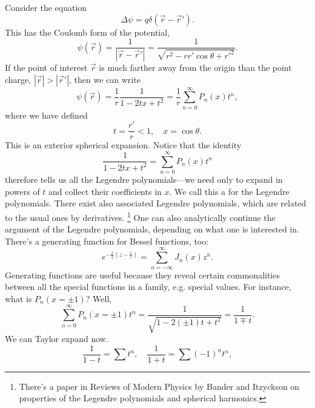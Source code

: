Consider the equation
\begin{equation}
    \Delta \psi = q\delta(\vec r- \vec r').
\end{equation}
This has the Coulomb form of the potential,
\begin{equation}
    \psi(\vec r) = \frac{1}{|\vec r - \vec r'|} = \frac{1}{\sqrt{r^2-r r' \cos\theta + r'^2}}.
\end{equation}
If the point of interest $\vec r$ is much farther away from the origin than the point charge, $|\vec r|>|\vec r'|$, then we can write
\begin{equation}
    \psi(\vec r) =\frac{1}{r} \frac{1}{1-2tx +t^2} = \frac{1}{r} \sum_{n=0}^\infty P_n(x) t^n,
\end{equation}
where we have defined
\begin{equation}
    t= \frac{r'}{r} <1, \quad  x = \cos\theta.
\end{equation}
This is an exterior spherical expansion. Notice that the identity
\begin{equation}
    \frac{1}{1-2tx +t^2} = \sum_{n=0}^\infty P_n(x) t^n
\end{equation}
therefore tells us all the Legendre polynomials---we need only to expand in powers of $t$ and collect their coefficients in $x$. We call this a  for the Legendre polynomials. There exist also associated Legendre polynomials, which are related to the usual ones by derivatives.%
    \footnote{There's a paper in Reviews of Modern Physics by Bander and Itzyckson on properties of the Legendre polynomials and spherical harmonics.}
One can also analytically continue the argument of the Legendre polynomials, depending on what one is interested in. There's a generating function for Bessel functions, too:
\begin{equation}
    e^{-\frac{x}{2}(z- \frac{1}{z})} = \sum_{n=-\infty}^\infty J_n(x) z^n.
\end{equation}
Generating functions are useful because they reveal certain commonalities between all the special functions in a family, e.g. special values. For instance, what is $P_n(x=\pm 1)$? Well,
\begin{equation}
    \sum_{n=0}^\infty P_n(x=\pm 1) t^n =\frac{1}{\sqrt{1-2(\pm 1)t +t^2}} = \frac{1}{1\mp t}.
\end{equation}
We can Taylor expand now.
\begin{equation}
    \frac{1}{1-t} = \sum t^n, \quad \frac{1}{1+t} = \sum (-1)^n t^n,
\end{equation}
